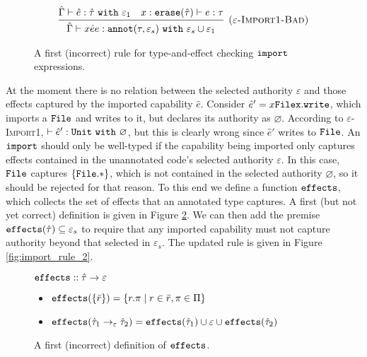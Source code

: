 \begin{figure}[h]
\vspace{-0.5cm}
\[
\begin{array}{c}

\infer[\textsc{($\varepsilon$-Import1-Bad)}]
	{ \hat \Gamma \vdash {x}{\hat e}{e}: \kwa{annot}(\tau, \varepsilon_s)~\kw{with} \varepsilon_s \cup \varepsilon_1 }
	{ \hat \Gamma \vdash \hat e: \hat \tau~\kw{with} \varepsilon_1 & x: \kwa{erase}(\hat \tau) \vdash e: \tau }

\end{array}
\]
\vspace{-0.5cm}
\caption{A first (incorrect) rule for type-and-effect checking $\mathtt{import}$ expressions.}
\vspace{-0.5cm}
\label{fig:import_rule_1}
\end{figure}

At the moment there is no relation between the selected authority
$\varepsilon$ and those effects captured by the imported capability
$\hat e$. Consider
$\hat e' = {x}{\mathtt{File}}{\mathtt{x.write}}$, which
imports a $\mathtt{File}$ and writes to it, but declares its authority as
$\varnothing$. According to \textsc{$\varepsilon$-Import1},
$\vdash \hat e': \mathtt{Unit}~\mathtt{with}~ \varnothing$, but this is clearly
wrong since $\hat e'$ writes to $\mathtt{File}$.  An $\mathtt{import}$
should only be well-typed if the capability being imported only
captures effects contained in the unannotated code's selected
authority $\varepsilon$. In this case, $\mathtt{File}$ captures
$\mathtt{ \{ File.* \}}$, which is not contained in the selected
authority $\varnothing$, so it should be rejected for that reason.  To
this end we define a function $\mathtt{effects}$, which collects the set
of effects that an annotated type captures. A first (but not yet
correct) definition is given in Figure \ref{fig:fx_defn}. We can then
add the premise $\mathtt{effects}(\hat \tau) \subseteq \varepsilon_s$ to
require that any imported capability must not capture authority beyond
that selected in $\varepsilon_s$. The updated rule is given in Figure
\ref{fig:import_rule_2}.

\begin{figure}

$\mathtt{effects} :: \hat \tau \rightarrow \varepsilon$
\begin{itemize}
	\setlength\itemsep{-0.2em}
	\item[] $\mathtt{effects}(\{ \bar r \}) = \{ r.\pi \mid r \in \bar r, \pi \in \Pi \}$
	\item[] $\mathtt{effects}(\hat \tau_1 \rightarrow_{\varepsilon} \hat \tau_2) = \mathtt{effects}(\hat \tau_1) \cup \varepsilon \cup \mathtt{effects}(\hat \tau_2)$
\end{itemize}
\vspace{-0.3cm}
\caption{A first (incorrect) definition of $\mathtt{effects}$.}
\vspace{-0.3cm}
\label{fig:fx_defn}
\end{figure}

